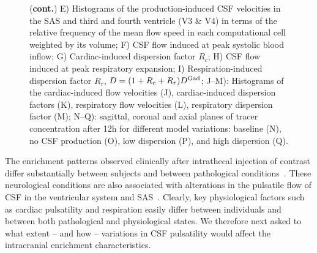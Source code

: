 \documentclass[fleqn,10pt]{wlscirep}
\providecommand{\DIFadd}[1]{{\protect\color{blue}\uwave{#1}}} %
\providecommand{\DIFaddbegin}{} %
\providecommand{\DIFaddend}{} %
\begin{document}
\begin{figure}
\ContinuedFloat
\caption{(\textbf{cont.})
E) Histograms of the production-induced CSF velocities in the SAS and third and fourth ventricle (V3 \& V4) in terms of the relative frequency of the mean flow speed in each computational cell weighted by its volume; 
F) CSF flow induced at peak systolic blood inflow; 
G) Cardiac-induced dispersion factor $R_c$;
H) CSF flow induced at peak respiratory expansion; 
I) Respiration-induced dispersion factor $R_r$, $D = (1 + R_c + R_r) D^{\rm Gad}$; J--M): Histograms of the cardiac-induced flow velocities (J),
cardiac-induced dispersion factors (K),
respiratory flow velocities (L), respiratory dispersion factor (M);
N--Q): sagittal, coronal and axial planes of tracer concentration after 12h for different model variations: baseline (N), no CSF production (O), low dispersion (P), and high dispersion (Q).
}
\end{figure}  

The \DIFaddbegin \DIFadd{tracer }\DIFaddend enrichment patterns observed clinically after intrathecal
injection of contrast differ substantially between subjects and
between pathological conditions~\cite{ringstad2018brain,
  eide2021direction, eide2021impaired, eide2022altered}. These
neurological conditions are also associated with alterations in the
pulsatile flow of CSF in the ventricular system and
SAS~\cite{eide2021direction}. Clearly, key physiological factors such
as cardiac pulsatility and respiration easily differ between
individuals and between both pathological and physiological states. We
therefore next asked to what extent -- and how -- variations in CSF
pulsatility would affect the intracranial enrichment characteristics.
\end{document}

